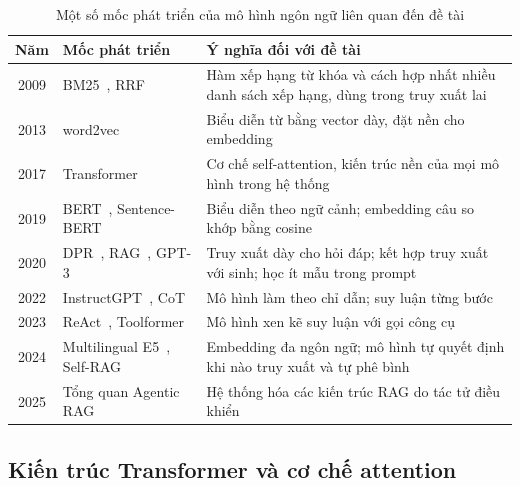 \begin{table}[H]
    \centering
    \caption{Một số mốc phát triển của mô hình ngôn ngữ liên quan đến đề tài}
    \label{tab:nlp_milestones}
    \small
    \begin{tabularx}{\textwidth}{|c|>{\raggedright\arraybackslash}p{4.4cm}|>{\raggedright\arraybackslash}X|}
        \toprule
        \textbf{Năm} & \textbf{Mốc phát triển} & \textbf{Ý nghĩa đối với đề tài} \\
        \midrule
        2009 & BM25~\cite{robertson2009bm25}, RRF~\cite{cormack2009rrf} & Hàm xếp hạng từ khóa và cách hợp nhất nhiều danh sách xếp hạng, dùng trong truy xuất lai \\ \hline
        2013 & word2vec~\cite{mikolov2013word2vec} & Biểu diễn từ bằng vector dày, đặt nền cho embedding \\ \hline
        2017 & Transformer~\cite{vaswani2017attention} & Cơ chế self-attention, kiến trúc nền của mọi mô hình trong hệ thống \\ \hline
        2019 & BERT~\cite{devlin2019bert}, Sentence-BERT~\cite{reimers2019sbert} & Biểu diễn theo ngữ cảnh; embedding câu so khớp bằng cosine \\ \hline
        2020 & DPR~\cite{karpukhin2020dpr}, RAG~\cite{lewis2020rag}, GPT-3~\cite{brown2020gpt3} & Truy xuất dày cho hỏi đáp; kết hợp truy xuất với sinh; học ít mẫu trong prompt \\ \hline
        2022 & InstructGPT~\cite{ouyang2022instructgpt}, CoT~\cite{wei2022cot} & Mô hình làm theo chỉ dẫn; suy luận từng bước \\ \hline
        2023 & ReAct~\cite{yao2023react}, Toolformer~\cite{schick2023toolformer} & Mô hình xen kẽ suy luận với gọi công cụ \\ \hline
        2024 & Multilingual E5~\cite{wang2024me5}, Self-RAG~\cite{asai2024selfrag} & Embedding đa ngôn ngữ; mô hình tự quyết định khi nào truy xuất và tự phê bình \\ \hline
        2025 & Tổng quan Agentic RAG~\cite{singh2025agenticrag} & Hệ thống hóa các kiến trúc RAG do tác tử điều khiển \\
        \bottomrule
    \end{tabularx}
\end{table}

\subsection{Kiến trúc Transformer và cơ chế attention}
\label{sec:transformer}

